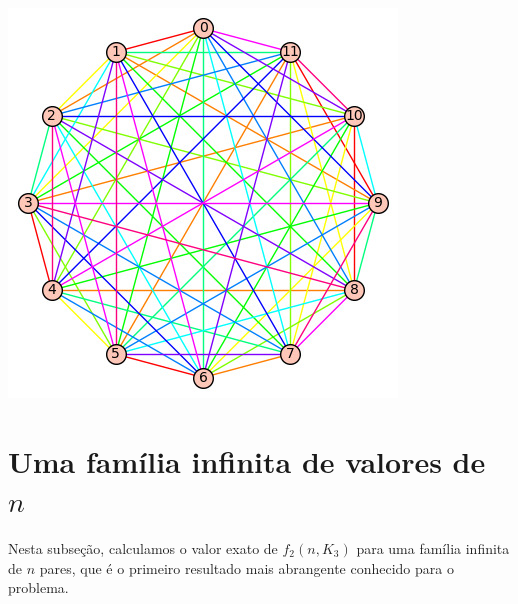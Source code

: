 \documentclass[12pt,a4paper]{book}
\begin{document}
  \begin{center}
			\includegraphics[scale=0.7, keepaspectratio=true]{k12-12colors.jpeg}
			\label{fig:K12} 
	\end{center}
	
	\section{Uma família infinita de valores de $n$}
	Nesta subseção, calculamos o valor exato de $f_2(n, K_3)$ para uma família infinita de $n$ pares, que é o primeiro resultado mais abrangente conhecido para o problema.
\end{document}

